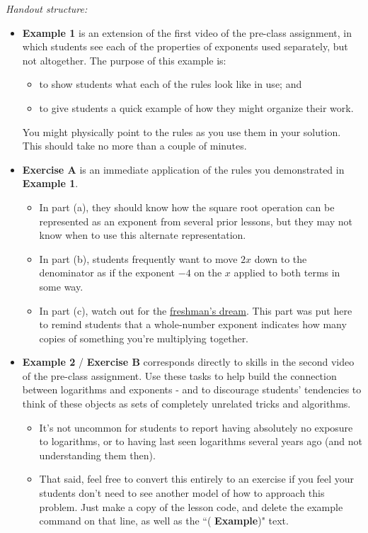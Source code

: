 \documentclass[10pt]{article}
\begin{document}
{\it Handout structure:}
\begin{itemize}
\item {\bf\color{blue}Example 1} is an extension of the first video of the pre-class assignment, in which students see each of the properties of exponents used separately, but not altogether. The purpose of this example is:
    \begin{itemize}
    \item to show students what each of the rules look like in use; and
    \item to give students a quick example of how they might organize their work.
    \end{itemize}
You might physically point to the rules as you use them in your solution. This should take no more than a couple of minutes. 
\item {\bf\color{blue}Exercise A} is an immediate application of the rules you demonstrated in {\bf\color{blue} Example 1}.
    \begin{itemize}
    \item In part (a), they should know how the square root operation can be represented as an exponent from several prior lessons, but they may not know when to use this alternate representation.
    \item In part (b), students frequently want to move $2x$ down to the denominator as if the exponent $-4$ on the $x$ applied to both terms in some way.
    \item In part (c), watch out for the {\color{blue}\href{https://en.wikipedia.org/wiki/Freshman%27s_dream}{freshman's dream}}. This part was put here to remind students that a whole-number exponent indicates how many copies of something you're multiplying together.
    \end{itemize} 
\item {\bf\color{blue} Example 2} / {\bf\color{blue} Exercise B} corresponds directly to skills in the second video of the pre-class assignment. Use these tasks to help build the connection between logarithms and exponents - and to discourage students' tendencies to think of these objects as sets of completely unrelated tricks and algorithms.
    \begin{itemize}
    \item It's not uncommon for students to report having absolutely no exposure to logarithms, or to having last seen logarithms several years ago (and not understanding them then).
    \item That said, feel free to convert this entirely to an exercise if you feel your students don't need to see another model of how to approach this problem. Just make a copy of the lesson code, and delete the example command on that line, as well as the ``({\bf\color{blue} Example})" text.

\end{itemize}
\end{itemize}
\end{document}
